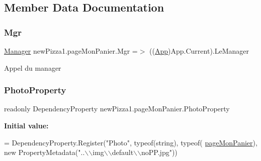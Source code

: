 \subsection{Member Data Documentation}
\mbox{\label{classnewPizza1_1_1pageMonPanier_a65e53ed4bd6187ed6837b84fb1deddae}} 
\subsubsection{\texorpdfstring{Mgr}{Mgr}}
{\footnotesize\ttfamily \hyperlink{classModele_1_1Manager}{Manager} new\+Pizza1.\+page\+Mon\+Panier.\+Mgr =$>$ ((\hyperlink{classnewPizza1_1_1App}{App})App.\+Current).Le\+Manager}



Appel du manager 

\mbox{\label{classnewPizza1_1_1pageMonPanier_aac88be6f84935fce54180f3f18c4a3b4}} 
\subsubsection{\texorpdfstring{Photo\+Property}{PhotoProperty}}
{\footnotesize\ttfamily readonly Dependency\+Property new\+Pizza1.\+page\+Mon\+Panier.\+Photo\+Property\hspace{0.3cm}{\ttfamily [static]}}

{\bfseries Initial value\+:}
\begin{DoxyCode}
=
            DependencyProperty.Register(\textcolor{stringliteral}{"Photo"}, typeof(\textcolor{keywordtype}{string}), typeof(
      \hyperlink{classnewPizza1_1_1pageMonPanier_ab752a6df6a2baf4cac209d7ded9b8cb9}{pageMonPanier}), \textcolor{keyword}{new} PropertyMetadata(\textcolor{stringliteral}{"..\(\backslash\)\(\backslash\)img\(\backslash\)\(\backslash\)default\(\backslash\)\(\backslash\)noPP.jpg"}))
\end{DoxyCode}
\mbox{\label{classnewPizza1_1_1pageMonPanier_ae3d4d6fe150e64a229c72169c535e007}} 
